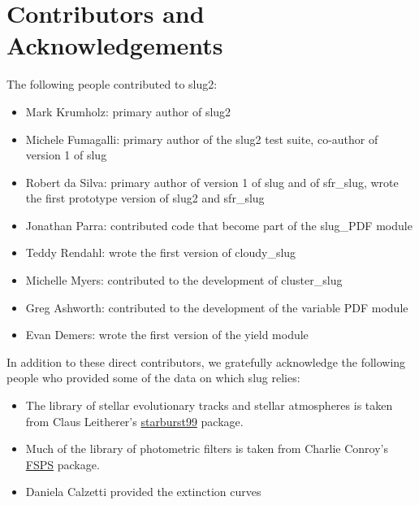 \documentclass[letterpaper,10pt,english]{sphinxmanual}
\begin{document}
\chapter{Contributors and Acknowledgements}
\label{acknowledgements::doc}\label{acknowledgements:contributors-and-acknowledgements}
The following people contributed to slug2:
\begin{itemize}
\item {} 
Mark Krumholz: primary author of slug2

\item {} 
Michele Fumagalli: primary author of the slug2 test suite, co-author of version 1 of slug

\item {} 
Robert da Silva: primary author of version 1 of slug and of sfr\_slug, wrote the first prototype version of slug2 and sfr\_slug

\item {} 
Jonathan Parra: contributed code that become part of the slug\_PDF module

\item {} 
Teddy Rendahl: wrote the first version of cloudy\_slug

\item {} 
Michelle Myers: contributed to the development of cluster\_slug

\item {} 
Greg Ashworth: contributed to the development of the variable PDF module

\item {} 
Evan Demers: wrote the first version of the yield module

\end{itemize}

In addition to these direct contributors, we gratefully acknowledge the following people who provided some of the data on which slug relies:
\begin{itemize}
\item {} 
The library of stellar evolutionary tracks and stellar atmospheres is taken from Claus Leitherer's \href{http://www.stsci.edu/science/starburst99/docs/default.htm}{starburst99} package.

\item {} 
Much of the library of photometric filters is taken from Charlie Conroy's \href{https://code.google.com/p/fsps/}{FSPS} package.

\item {} 
Daniela Calzetti provided the extinction curves

\end{itemize}
\end{document}

